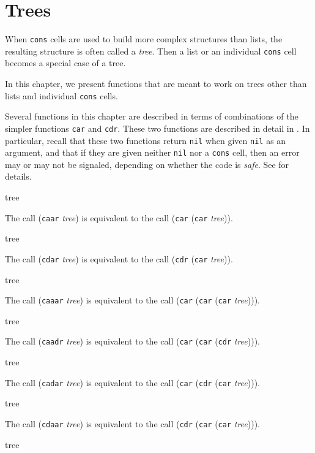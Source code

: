 \chapter{Trees}
\label{chap-trees}

When \texttt{cons} cells are used to build more complex structures
than lists, the resulting structure is often called a \emph{tree}.
Then a list or an individual \texttt{cons} cell becomes a special case
of a tree.

In this chapter, we present functions that are meant to work on trees
other than lists and individual \texttt{cons} cells.

Several functions in this chapter are described in terms of
combinations of the simpler functions \texttt{car} and \texttt{cdr}.
These two functions are described in detail in
.  In particular, recall that these
two functions return \texttt{nil} when given \texttt{nil} as an
argument, and that if they are given neither \texttt{nil} nor a
\texttt{cons} cell, then an error may or may not be signaled,
depending on whether the code is \emph{safe}.  See
 for details.

 {tree}

The call (\texttt{caar} \textit{tree}) is equivalent to the call
(\texttt{car} (\texttt{car} \textit{tree})).

 {tree}

The call (\texttt{cdar} \textit{tree}) is equivalent to the call
(\texttt{cdr} (\texttt{car} \textit{tree})).

 {tree}

The call (\texttt{caaar} \textit{tree}) is equivalent to the call
(\texttt{car} (\texttt{car} (\texttt{car} \textit{tree}))).

 {tree}

The call (\texttt{caadr} \textit{tree}) is equivalent to the call
(\texttt{car} (\texttt{car} (\texttt{cdr} \textit{tree}))).

 {tree}

The call (\texttt{cadar} \textit{tree}) is equivalent to the call
(\texttt{car} (\texttt{cdr} (\texttt{car} \textit{tree}))).

 {tree}

The call (\texttt{cdaar} \textit{tree}) is equivalent to the call
(\texttt{cdr} (\texttt{car} (\texttt{car} \textit{tree}))).

 {tree}

